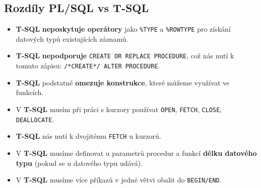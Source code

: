 \subsection{Rozdíly PL/SQL vs T-SQL}
\begin{itemize}
\item \textbf{T-SQL} \textbf{neposkytuje operátory} jako \texttt{\%TYPE} a \texttt{\%ROWTYPE} pro získání datových typů existujících záznamů.
\item \textbf{T-SQL} \textbf{nepodporuje} \texttt{CREATE OR REPLACE PROCEDURE}, což nás nutí k tomuto zápisu: \texttt{/*CREATE*/ ALTER PROCEDURE}.
\item \textbf{T-SQL} podstatně \textbf{omezuje konstrukce}, které můžeme využívat ve funkcích.
\item V \textbf{T-SQL} musím při práci s kurzory používat \texttt{OPEN}, \texttt{FETCH}, \texttt{CLOSE}, \texttt{DEALLOCATE}.
\item \textbf{T-SQL} nás nutí k dvojitému \texttt{FETCH} u kurzorů. 
\item V \textbf{T-SQL} musíme definovat u parametrů procedur a funkcí \textbf{délku datového typu} (pokud se u datového typu udává).
\item V \textbf{T-SQL} musíme více příkazů v jedné větvi obalit do \texttt{BEGIN/END}.
\end{itemize}



